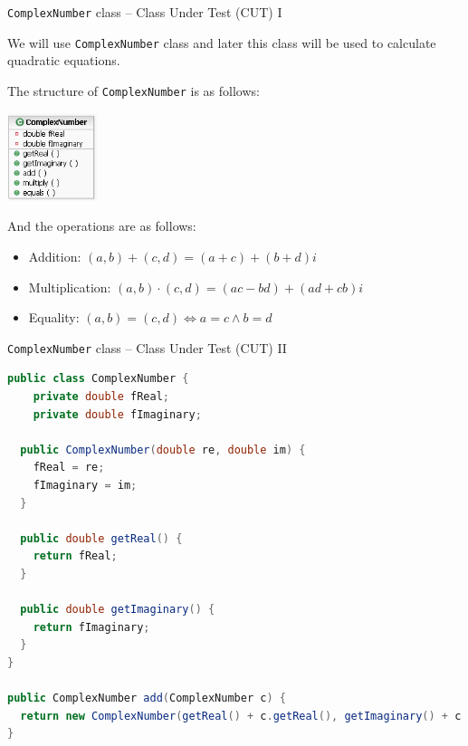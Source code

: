 \documentclass[11pt, xcolor=svgnames]{beamer}
\begin{document}
\begin{frame}[fragile]{\texttt{ComplexNumber} class -- Class Under Test (CUT) I}

We will use \texttt{ComplexNumber} class and later this class will be used to calculate quadratic equations.

The structure of \texttt{ComplexNumber} is as follows:

\begin{center}
 \includegraphics[width=75pt]{./figs/ComplexNumber}
\end{center}

And the operations are as follows:

\begin{itemize}
 \item Addition: $(a,b)+(c,d)=(a+c)+(b+d)i$
 \item Multiplication: $(a,b)\cdot(c,d)=(ac-bd) + (ad+cb)i$
 \item Equality: $(a,b)=(c,d) \Leftrightarrow a=c \wedge b=d$
\end{itemize}

\end{frame}




\begin{frame}[fragile]{\texttt{ComplexNumber} class -- Class Under Test (CUT) II}



\begin{lstlisting}[language=Java,basicstyle=\scriptsize]
public class ComplexNumber {
    private double fReal;
    private double fImaginary;

  public ComplexNumber(double re, double im) {
    fReal = re;
    fImaginary = im;
  }

  public double getReal() {
    return fReal;
  }

  public double getImaginary() {
    return fImaginary;
  }
}

public ComplexNumber add(ComplexNumber c) {
  return new ComplexNumber(getReal() + c.getReal(), getImaginary() + c.getImaginary());
}
\end{lstlisting}

\end{frame}
\end{document}
